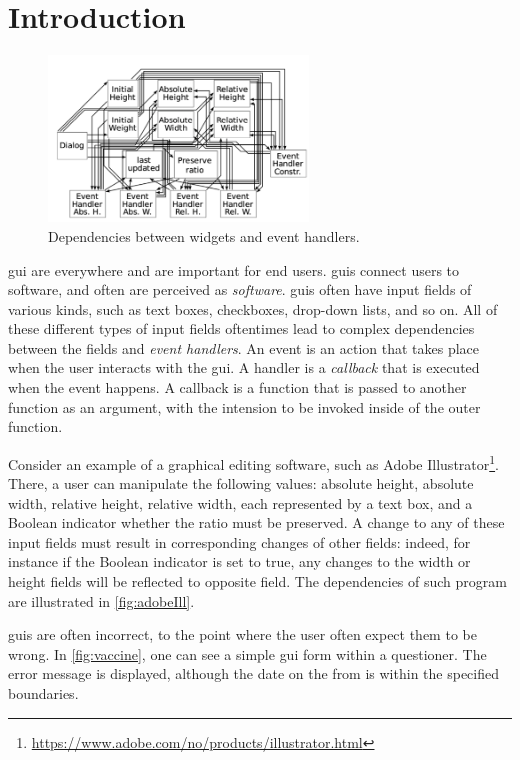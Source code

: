 \chapter{Introduction}

\begin{figure}
    \includegraphics[width=6.9cm, frame]{figures/adobeIll.png}
    \caption{Dependencies between widgets and event handlers.}
    \label{fig:adobeIll}
\end{figure}

\gls{gui} are everywhere and are important for end users. \gls{gui}s connect users to software, and often are perceived as \emph{software}. \gls{gui}s often have input fields of various kinds, such as text boxes, checkboxes, drop-down lists, and so on. All of these different types of input fields oftentimes lead to complex dependencies between the fields and \textit{event handlers}. An event is an action that takes place when the user interacts with the \gls{gui}. A handler is a \textit{callback} that is executed when the event happens. A callback is a function that is passed to another function as an argument, with the intension to be invoked inside of the outer function. 

Consider an example of a graphical editing software, such as Adobe Illustrator\footnote{\url{https://www.adobe.com/no/products/illustrator.html}}.  There, a user can manipulate the following values: absolute height, absolute width, relative height, relative width, each represented by a text box, and a Boolean indicator whether the ratio must be preserved. A change to any of these input fields must result in corresponding changes of other fields: indeed, for instance if the Boolean indicator is set to true, any changes to the width or height fields will be reflected to opposite field. The dependencies of such program are illustrated in \autoref{fig:adobeIll}.

\gls{gui}s are often incorrect, to the point where the user often expect them to be wrong. In \autoref{fig:vaccine}, one can see a simple \gls{gui} form within a questioner. The error message is displayed, although the date on the from is within the specified boundaries.

